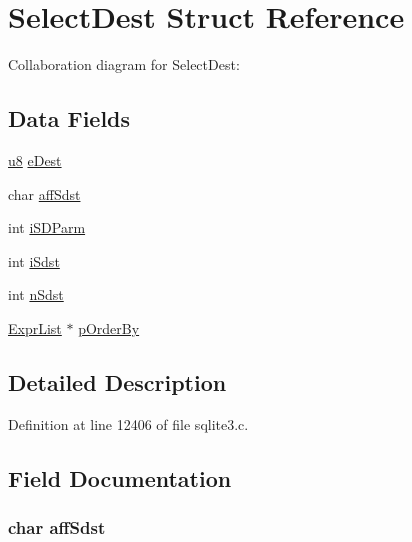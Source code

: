 \hypertarget{struct_select_dest}{}\section{Select\+Dest Struct Reference}
\label{struct_select_dest}


Collaboration diagram for Select\+Dest\+:
\subsection*{Data Fields}
\begin{DoxyCompactItemize}
\item 
\hyperlink{sqlite3_8c_a74a0f6424ae628af25f23f0a35f6ead3}{u8} \hyperlink{struct_select_dest_aaa86d55283947db49520122062f74e1e}{e\+Dest}
\item 
char \hyperlink{struct_select_dest_ad4cc819e587d69ce37294a089b26bbef}{aff\+Sdst}
\item 
int \hyperlink{struct_select_dest_a3d334c4f8a37baba3876773660d7d876}{i\+S\+D\+Parm}
\item 
int \hyperlink{struct_select_dest_a0f6bcbdfbe94046ca304a0149d97efc8}{i\+Sdst}
\item 
int \hyperlink{struct_select_dest_a9a504236f70a6baca1f3dc884ab3c23c}{n\+Sdst}
\item 
\hyperlink{struct_expr_list}{Expr\+List} $\ast$ \hyperlink{struct_select_dest_a9150e506e5902e336130c9764caf96a0}{p\+Order\+By}
\end{DoxyCompactItemize}


\subsection{Detailed Description}


Definition at line 12406 of file sqlite3.\+c.



\subsection{Field Documentation}
\hypertarget{struct_select_dest_ad4cc819e587d69ce37294a089b26bbef}{}
\subsubsection[{aff\+Sdst}]{\setlength{\rightskip}{0pt plus 5cm}char aff\+Sdst}\label{struct_select_dest_ad4cc819e587d69ce37294a089b26bbef}


